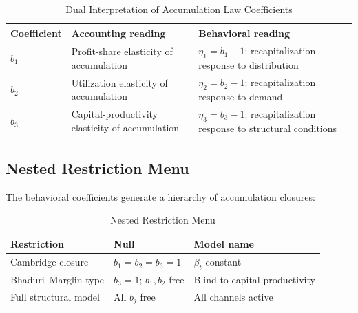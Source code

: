 \documentclass[12pt,letterpaper]{article}
\newcommand{\betat}{\beta_t}       %
\begin{document}
\begin{table}[h]
  \centering
  \caption{Dual Interpretation of Accumulation Law Coefficients}
  \label{tab:dual}
  \begin{tabular}{lll}
    \toprule
    Coefficient & Accounting reading & Behavioral reading \\
    \midrule
    $b_1$ & Profit-share elasticity of accumulation
           & $\eta_1 = b_1 - 1$: recapitalization response to distribution \\
    $b_2$ & Utilization elasticity of accumulation
           & $\eta_2 = b_2 - 1$: recapitalization response to demand \\
    $b_3$ & Capital-productivity elasticity of accumulation
           & $\eta_3 = b_3 - 1$: recapitalization response to structural conditions \\
    \bottomrule
  \end{tabular}
  \bigskip

\end{table}


\subsection{Nested Restriction Menu}
\label{sec:restrictions}

The behavioral coefficients generate a hierarchy of accumulation closures:

\begin{table}[h]
  \centering
  \caption{Nested Restriction Menu}
  \label{tab:restrictions}
  \begin{tabular}{lll}
    \toprule
    Restriction & Null & Model name \\
    \midrule
    Cambridge closure       & $b_1 = b_2 = b_3 = 1$ & $\betat$ constant \\
    Bhaduri--Marglin type   & $b_3 = 1$; $b_1, b_2$ free & Blind to capital productivity \\
    Full structural model   & All $b_j$ free & All channels active \\
    \bottomrule
  \end{tabular}
\end{table}


\end{document}
